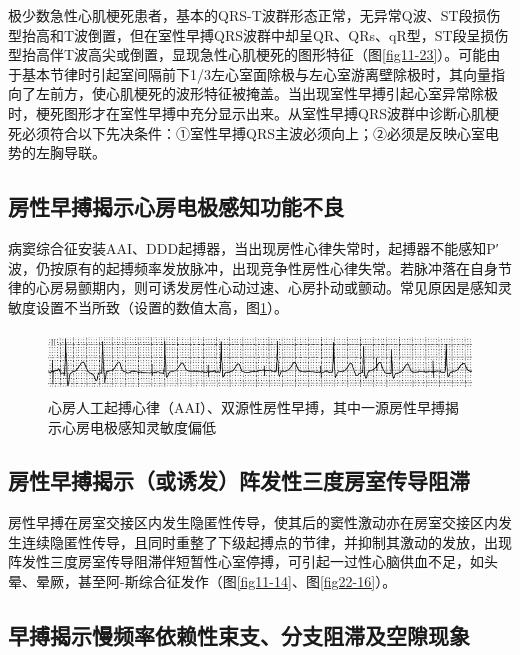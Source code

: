 极少数急性心肌梗死患者，基本的QRS-T波群形态正常，无异常Q波、ST段损伤型抬高和T波倒置，但在室性早搏QRS波群中却呈QR、QRs、qR型，ST段呈损伤型抬高伴T波高尖或倒置，显现急性心肌梗死的图形特征（图\ref{fig11-23}）。可能由于基本节律时引起室间隔前下1/3左心室面除极与左心室游离壁除极时，其向量指向了左前方，使心肌梗死的波形特征被掩盖。当出现室性早搏引起心室异常除极时，梗死图形才在室性早搏中充分显示出来。从室性早搏QRS波群中诊断心肌梗死必须符合以下先决条件：①室性早搏QRS主波必须向上；②必须是反映心室电势的左胸导联。

\protect\hypertarget{text00043.htmlux5cux23subid470}{}{}

\subsection{房性早搏揭示心房电极感知功能不良}

病窦综合征安装AAI、DDD起搏器，当出现房性心律失常时，起搏器不能感知P′波，仍按原有的起搏频率发放脉冲，出现竞争性房性心律失常。若脉冲落在自身节律的心房易颤期内，则可诱发房性心动过速、心房扑动或颤动。常见原因是感知灵敏度设置不当所致（设置的数值太高，图\ref{fig36-7}）。

\begin{figure}[!htbp]
 \centering
 \includegraphics[width=5.58333in,height=0.64583in]{./images/Image00579.jpg}
 \captionsetup{justification=centering}
 \caption{心房人工起搏心律（AAI）、双源性房性早搏，其中一源房性早搏揭示心房电极感知灵敏度偏低}
 \label{fig36-7}
  \end{figure} 

\protect\hypertarget{text00043.htmlux5cux23subid471}{}{}

\subsection{房性早搏揭示（或诱发）阵发性三度房室传导阻滞}

房性早搏在房室交接区内发生隐匿性传导，使其后的窦性激动亦在房室交接区内发生连续隐匿性传导，且同时重整了下级起搏点的节律，并抑制其激动的发放，出现阵发性三度房室传导阻滞伴短暂性心室停搏，可引起一过性心脑供血不足，如头晕、晕厥，甚至阿-斯综合征发作（图\ref{fig11-14}、图\ref{fig22-16}）。

\protect\hypertarget{text00043.htmlux5cux23subid472}{}{}

\subsection{早搏揭示慢频率依赖性束支、分支阻滞及空隙现象}

